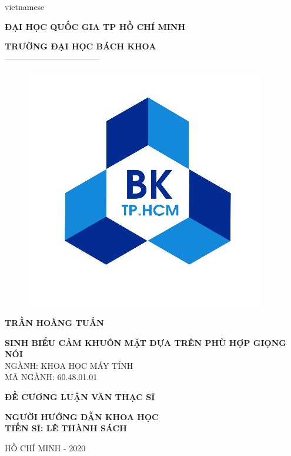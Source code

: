 \begin{titlepage}

\begin{center}

\vspace*{3\bigskipamount}

\begin{otherlanguage*}{vietnamese}

\makeatletter
\fontsize{12}{12}\textbf{ĐẠI HỌC QUỐC GIA TP HỒ CHÍ MINH}
\makeatother

\makeatletter
\fontsize{14}{14}\textbf{TRƯỜNG ĐẠI HỌC BÁCH KHOA}\\
\fontsize{14}{14} -----------------------------------
\makeatother

\begin{figure}[h]
	\centering
		\includegraphics[width=0.4\columnwidth]{./title/bach_khoa.jpeg}
		\centering
	\label{fig:logo}
\end{figure}

{\makeatletter
\fontsize{16}{16}\textbf{TRẦN HOÀNG TUẤN}
\makeatother}

\vspace{1cm}

{\makeatletter
\fontsize{16}{16}\textbf{SINH BIỂU CẢM KHUÔN MẶT DỰA TRÊN PHÙ HỢP GIỌNG NÓI}\\
\vspace{1cm}
\fontsize{12}{12} NGÀNH: KHOA HỌC MÁY TÍNH\\
\fontsize{12}{12} MÃ NGÀNH: 60.48.01.01\\
\makeatother}

\vspace{1cm}
{\makeatletter
\fontsize{12}{12}\textbf{ĐỀ CƯƠNG LUẬN VĂN THẠC SĨ}\\
\makeatother}

\vspace{1cm}
{\makeatletter
\fontsize{12}{12}\textbf{NGƯỜI HƯỚNG DẪN KHOA HỌC}\\
\fontsize{12}{12}\textbf{TIẾN SĨ: LÊ THÀNH SÁCH}\\
\makeatother}

\vspace{4cm}
{\makeatletter
\fontsize{12}{12} HỒ CHÍ MINH - 2020\\
\makeatother}

\end{otherlanguage*}

\vfill
\end{center}
\end{titlepage}


